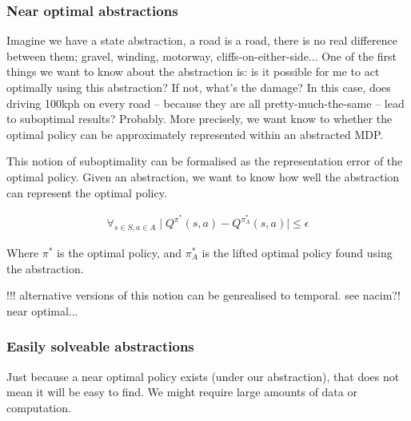 

\subsubsection{Near optimal abstractions}

Imagine we have a state abstraction, a road is a road, there is no real difference
between them; gravel, winding, motorway, cliffs-on-either-side...
One of the first things we want to know about the abstraction is:
is it possible for me to act optimally
using this abstraction? If not, what's the damage? In this case, does driving 100kph on every road --
because they are all pretty-much-the-same -- lead to suboptimal results? Probably.
More precisely, we want know to whether the optimal policy can be approximately represented within an abstracted MDP.

This notion of suboptimality can be formalised as the representation error of the optimal
policy. Given an abstraction, we want to know how well
the abstraction can represent the optimal policy.

\begin{align}
\forall_{s\in S, a\in A} \mid Q^{\pi^* }(s, a) - Q^{\pi_{A}^* }(s, a) \mid \le \epsilon
\end{align}

Where $\pi^{* }$ is the optimal policy, and $\pi_{A}^{* }$ is the lifted optimal
policy found using the abstraction.

{\color{red}!!! alternative versions of this notion can be genrealised to temporal. see nacim?! near optimal...}


\subsubsection{Easily solveable abstractions}


Just because a near optimal policy exists (under our abstraction), that does not mean it will be easy to find. We might require large amounts of data or computation.

